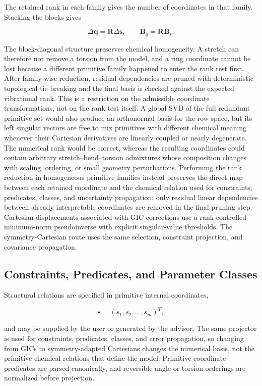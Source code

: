 \documentclass[aip,jcp,reprint,longbibliography,floatfix]{revtex4-2}
\begin{document}
The retained rank in each family gives the number of coordinates in that
family. Stacking the blocks gives

\begin{equation}
\Delta \mathbf{q}
=
\mathbf{R}
\Delta \mathbf{s},
\qquad
\mathbf{B}_{q}
=
\mathbf{R}
\mathbf{B}_s .
\end{equation}

The block-diagonal structure preserves chemical homogeneity. A stretch can
therefore not remove a torsion from the model, and a ring coordinate cannot be
lost because a different primitive family happened to enter the rank test
first. After family-wise reduction, residual dependencies are pruned with
deterministic topological tie breaking and the final basis is checked against
the expected vibrational rank.
This is a restriction on the admissible coordinate transformations, not on the
rank test itself. A global SVD of the full redundant primitive set would also
produce an orthonormal basis for the row space, but its left singular vectors
are free to mix primitives with different chemical meaning whenever their
Cartesian derivatives are linearly coupled or nearly degenerate. The numerical
rank would be correct, whereas the resulting coordinates could contain
arbitrary stretch--bend--torsion admixtures whose composition changes with
scaling, ordering, or small geometry perturbations. Performing the rank
reduction in homogeneous primitive families instead preserves the direct map
between each retained coordinate and the chemical relation used for
constraints, predicates, classes, and uncertainty propagation; only residual
linear dependencies between already interpretable coordinates are removed in
the final pruning step.
Cartesian displacements associated with GIC corrections use a rank-controlled
minimum-norm pseudoinverse with explicit singular-value thresholds. The
symmetry-Cartesian route uses the same selection, constraint projection, and
covariance propagation.


\subsection{Constraints, Predicates, and Parameter Classes}

Structural relations are specified in primitive internal coordinates,

\begin{equation}
\mathbf{s} = (s_1,s_2,\ldots,s_m)^T ,
\end{equation}

and may be supplied by the user or generated by the advisor. The same
projector is used for constraints, predicates, classes, and error propagation,
so changing from GICs to symmetry-adapted Cartesians changes the numerical
basis, not the primitive chemical relations that define the model.
Primitive-coordinate predicates are parsed canonically, and reversible
angle or torsion orderings are normalized before projection.
\end{document}
